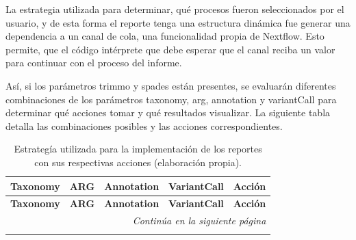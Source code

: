 \documentclass[12pt]{article}
\begin{document}
La estrategia utilizada para determinar, qué procesos fueron 
seleccionados por el usuario, y de esta forma el reporte tenga 
una estructura dinámica fue generar una dependencia a un canal de 
cola, una funcionalidad propia de Nextflow. Esto permite, que el 
código intérprete que debe esperar que el canal reciba un valor para 
continuar con el proceso del informe.

Así, si los parámetros trimmo y spades están presentes, se evaluarán 
diferentes combinaciones de los parámetros taxonomy, arg, annotation y 
variantCall para determinar qué acciones tomar y qué resultados visualizar.
La siguiente tabla detalla las combinaciones posibles y las acciones 
correspondientes. 

\begin{longtable}{|c|c|c|c|p{6cm}|}
    \caption{Estrategía utilizada para la implementación de los reportes con sus respectivas acciones (elaboración propia).}
    \label{tabla:acciones} \\
    \hline
    \textbf{Taxonomy} & \textbf{ARG} & \textbf{Annotation} & \textbf{VariantCall} & \textbf{Acción} \\
    \hline
    \endfirsthead
    
    \hline
    \textbf{Taxonomy} & \textbf{ARG} & \textbf{Annotation} & \textbf{VariantCall} & \textbf{Acción} \\
    \hline
    \endhead
    
    \hline \multicolumn{5}{r}{\textit{Continúa en la siguiente página}} \\
    \endfoot
    
    \hline
    \endlastfoot
    

\end{longtable}
\end{document}
